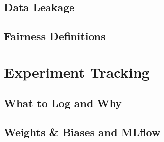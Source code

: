 
\subsection{Data Leakage}

\subsection{Fairness Definitions}


\section{Experiment Tracking}
\label{sec:experiment-tracking}

\subsection{What to Log and Why}


\subsection{Weights \& Biases and MLflow}
